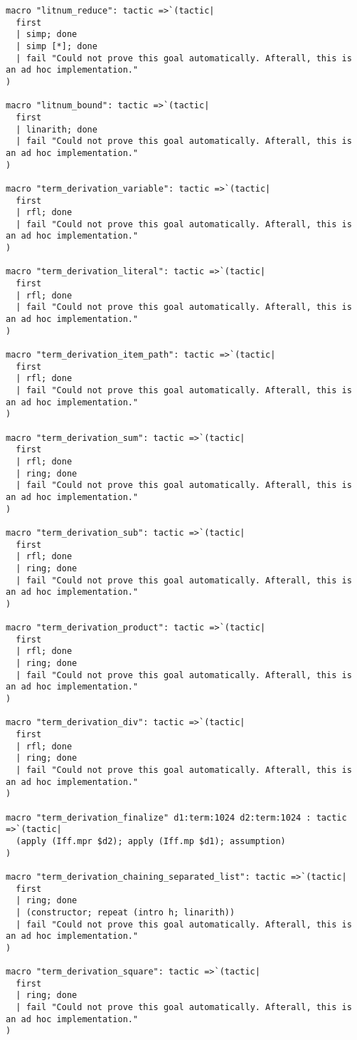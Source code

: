 \documentclass{article}
\begin{document}
\begin{tcolorbox}[colback=white!10, width=\linewidth]
\begin{lstlisting}[language=Lean4]
macro "litnum_reduce": tactic =>`(tactic|
  first
  | simp; done
  | simp [*]; done
  | fail "Could not prove this goal automatically. Afterall, this is an ad hoc implementation."
)

macro "litnum_bound": tactic =>`(tactic|
  first
  | linarith; done
  | fail "Could not prove this goal automatically. Afterall, this is an ad hoc implementation."
)

macro "term_derivation_variable": tactic =>`(tactic|
  first
  | rfl; done
  | fail "Could not prove this goal automatically. Afterall, this is an ad hoc implementation."
)

macro "term_derivation_literal": tactic =>`(tactic|
  first
  | rfl; done
  | fail "Could not prove this goal automatically. Afterall, this is an ad hoc implementation."
)

macro "term_derivation_item_path": tactic =>`(tactic|
  first
  | rfl; done
  | fail "Could not prove this goal automatically. Afterall, this is an ad hoc implementation."
)

macro "term_derivation_sum": tactic =>`(tactic|
  first
  | rfl; done
  | ring; done
  | fail "Could not prove this goal automatically. Afterall, this is an ad hoc implementation."
)

macro "term_derivation_sub": tactic =>`(tactic|
  first
  | rfl; done
  | ring; done
  | fail "Could not prove this goal automatically. Afterall, this is an ad hoc implementation."
)

macro "term_derivation_product": tactic =>`(tactic|
  first
  | rfl; done
  | ring; done
  | fail "Could not prove this goal automatically. Afterall, this is an ad hoc implementation."
)

macro "term_derivation_div": tactic =>`(tactic|
  first
  | rfl; done
  | ring; done
  | fail "Could not prove this goal automatically. Afterall, this is an ad hoc implementation."
)

macro "term_derivation_finalize" d1:term:1024 d2:term:1024 : tactic =>`(tactic|
  (apply (Iff.mpr $d2); apply (Iff.mp $d1); assumption)
)

macro "term_derivation_chaining_separated_list": tactic =>`(tactic|
  first
  | ring; done
  | (constructor; repeat (intro h; linarith))
  | fail "Could not prove this goal automatically. Afterall, this is an ad hoc implementation."
)

macro "term_derivation_square": tactic =>`(tactic|
  first
  | ring; done
  | fail "Could not prove this goal automatically. Afterall, this is an ad hoc implementation."
)


\end{lstlisting}
\end{tcolorbox}
\end{document}
